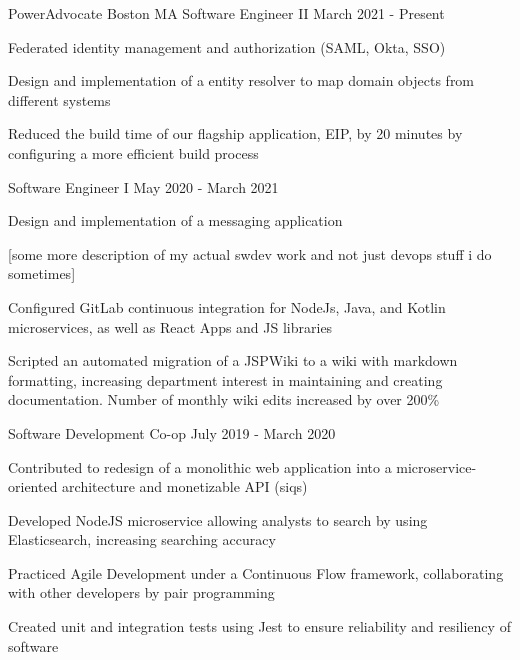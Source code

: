 
\begin{cventries}
\cventrythreepositions
    {PowerAdvocate}
    {Boston MA}
    {Software Engineer II} %
    {March 2021 - Present} %
    {
        \begin{cvitems} %
            \item {Federated identity management and authorization (SAML, Okta, SSO)}
            \item {Design and implementation of a entity resolver to map domain objects from different systems}
            \item {Reduced the build time of our flagship application, EIP, by 20 minutes by configuring a more efficient build process}
        \end{cvitems}
    }
    {Software Engineer I}
    {May 2020 - March 2021}
    {
      \begin{cvitems} %
        \item {Design and implementation of a messaging application}
        \item {[some more description of my actual swdev work and not just devops stuff i do sometimes]}
        \item {Configured GitLab continuous integration for NodeJs, Java, and Kotlin microservices, as well as React Apps and JS libraries}
        \item {Scripted an automated migration of a JSPWiki to a wiki with markdown formatting, increasing department interest in maintaining and creating documentation. Number of monthly wiki edits increased by over 200\%}
      \end{cvitems}
    }
    {Software Development Co-op}
    {July 2019 - March 2020}
    {
      \begin{cvitems} %
        \item {Contributed to redesign of a monolithic web application into a microservice-oriented architecture and monetizable API (siqs)}
        \item {Developed NodeJS microservice allowing analysts to search by using Elasticsearch, increasing searching accuracy}
        \item {Practiced Agile Development under a Continuous Flow framework, collaborating with other developers by pair programming}
        \item {Created unit and integration tests using Jest to ensure reliability and resiliency of software}
      \end{cvitems}
    }


\end{cventries}
